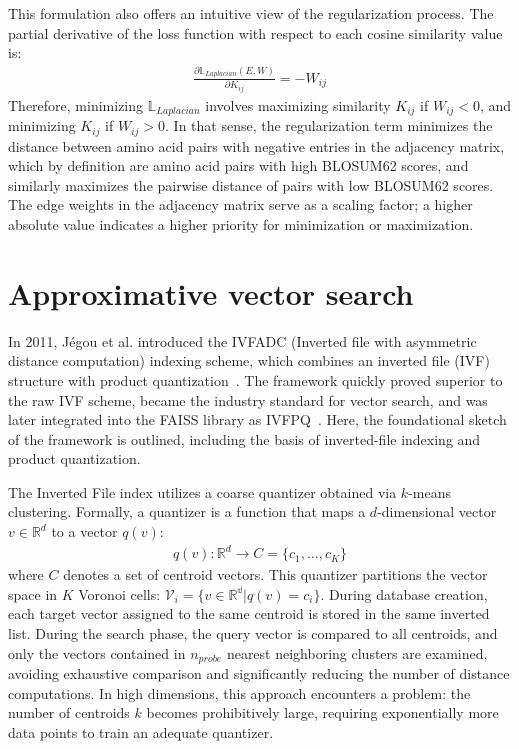 \documentclass[twoside,a4paper]{master}
\begin{document}
This formulation also offers an intuitive view of the regularization process. The partial derivative of the loss function with respect to each cosine similarity value is:
\begin{align}
    \frac{\partial \mathbb{L}_{Laplacian}(E,W)}{\partial K_{ij}} = -W_{ij}
\end{align}
Therefore, minimizing \(\mathbb{L}_{Laplacian}\) involves maximizing similarity \(K_{ij}\) if \(W_{ij} < 0\), and minimizing \(K_{ij}\) if \(W_{ij} > 0\). In that sense, the regularization term minimizes the distance between amino acid pairs with negative entries in the adjacency matrix, which by definition are amino acid pairs with high BLOSUM62 scores, and similarly maximizes the pairwise distance of pairs with low BLOSUM62 scores. The edge weights in the adjacency matrix serve as a scaling factor; a higher absolute value indicates a higher priority for minimization or maximization.

\section{Approximative vector search}
In 2011, Jégou et al. introduced the IVFADC (Inverted file with asymmetric distance computation) indexing scheme, which combines an inverted file (IVF) structure with product quantization~\cite{10.1109/TPAMI.2010.57}. The framework quickly proved superior to the raw IVF scheme, became the industry standard for vector search, and was later integrated into the FAISS library as IVFPQ~\cite{douze2025faiss}. Here, the foundational sketch of the framework is outlined, including the basis of inverted-file indexing and product quantization.

The Inverted File index utilizes a coarse quantizer obtained via \(k\)-means clustering. Formally, a quantizer is a function that maps a \(d\)-dimensional vector \(v \in \mathbb{R}^d\) to a vector \(q(v)\):
\begin{align}
    q(v): \mathbb{R}^d \rightarrow C=\{c_1,\ldots,c_K\}
\end{align}
where \(C\) denotes a set of centroid vectors. This quantizer partitions the vector space in \(K\) Voronoi cells: \(\mathcal{V}_i = \{v\in \mathbb{R^d}|q(v) = c_i\}\). During database creation, each target vector assigned to the same centroid is stored in the same inverted list. During the search phase, the query vector is compared to all centroids, and only the vectors contained in \(n_{probe}\) nearest neighboring clusters are examined, avoiding exhaustive comparison and significantly reducing the number of distance computations. In high dimensions, this approach encounters a problem: the number of centroids \(k\) becomes prohibitively large, requiring exponentially more data points to train an adequate quantizer.
\end{document}

